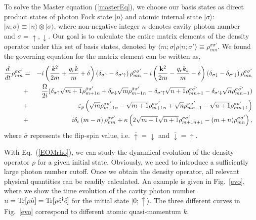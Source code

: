 \documentclass[atoms,article,submit,moreauthors,pdftex,12pt,a4paper]{mdpi}
\def\ba{\begin{eqnarray}}
\def\ea{\end{eqnarray}}
\begin{document}
To solve the Master equation (\ref{masterEq}), we choose our basis states as direct product states of photon Fock state $|n \rangle$ and atomic internal state $|\sigma \rangle$: $|n;\sigma\rangle \equiv |n \rangle \otimes |\sigma \rangle$, %
where non-negative integer $n$ denotes cavity photon number and $\sigma=\uparrow,\downarrow$. Our goal is to calculate the entire matrix elements of the density operator under this set of basis states, denoted by $\langle m;\sigma|\rho|n;\sigma'\rangle\equiv\rho_{mn}^{\sigma\sigma'}$. We found the governing equation for the matrix element can be written as,
\ba 
\frac{d}{dt}\rho_{mn}^{\sigma\sigma'} 
& = & -i\left(\frac{{k}^{2}}{2m}+\frac{q_{r}k}{m}+ \delta\right)\left(\delta_{\sigma\uparrow}-\delta_{\sigma'\uparrow}\right)\rho_{mn}^{\sigma\sigma'}
-  i\left(\frac{{\bf k}^{2}}{2m}-\frac{q_{r}k_{z}}{m}-\delta\right)\left(\delta_{\sigma\downarrow}-\delta_{\sigma'\downarrow}\right)\rho_{mn}^{\sigma\sigma'}\nonumber\\
& + & \frac{\Omega}{2i}(\delta_{\sigma\uparrow}\sqrt{m+1}\rho_{m+1n}^{\bar{\sigma}\sigma'}
+\delta_{\sigma\downarrow}\sqrt{m}\rho_{m-1n}^{\bar{\sigma}\sigma'}
-\delta_{\sigma'\uparrow}\sqrt{n+1}\rho_{mn+1}^{\sigma\bar{\sigma'}}
-\delta_{\sigma'\downarrow}\sqrt{n}\rho_{mn-1}^{\sigma\bar{\sigma'}})\nonumber\\
& + & \varepsilon_{p}\left(\sqrt{m}\rho_{m-1n}^{\sigma\sigma'}-\sqrt{m+1}\rho_{m+1n}^{\sigma\sigma'}+\sqrt{n}\rho_{mn-1}^{\sigma\sigma'}-\sqrt{n+1}\rho_{mn+1}^{\sigma\sigma'}\right)\nonumber\\
& + & i\delta_{c}\left(m-n\right)\rho_{mn}^{\sigma\sigma'}
+ \kappa\left(2\sqrt{m+1}\sqrt{n+1}\rho_{m+1n+1}^{\sigma\sigma'}-(m+n)\rho_{mn}^{\sigma\sigma'}\right),\label{EOMrho}
\ea
where $\bar{\sigma}$ represents the flip-spin value, i.e. $\bar{\uparrow}=\downarrow$ and $\bar{\downarrow}=\uparrow$. 

With Eq.~(\ref{EOMrho}), we can study the dynamical evolution of the density operator $\rho$ for a given initial state. Obviously, we need to introduce a sufficiently large photon number cutoff. Once we obtain the density operator, all relevant physical quantities can be readily calculated. An example is given in Fig.~\ref{evo}, where we show the time evolution of the cavity photon number $n = {\rm Tr}[\rho \hat{n}]= {\rm Tr}[\rho \hat{c}^\dag \hat{c}]$ for the initial state $|0; \uparrow \rangle$. The three different curves in Fig.~\ref{evo} correspond to different atomic quasi-momentum $k$. 
\end{document}
